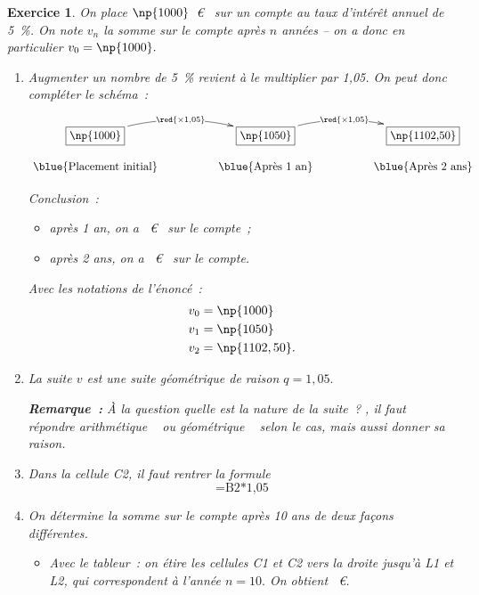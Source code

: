 \documentclass[10pt]{article}
\newtheorem{exo}{Exercice}
\begin{document}
\begin{exo}

On place $\np{1000}$~\euro~{} sur un compte au taux d'intérêt annuel de 5~\%. On note $v_n$ la somme sur le compte après $n$ années -- on a donc en particulier $v_0=\np{1000}.$
\begin{enumerate}
\item Augmenter un nombre de 5~\% revient à le multiplier par 1,05. On peut donc compléter le schéma~:

\begin{center}
$\xymatrix@R=0.5pc@C=4pc{
    *+[F]+\txt{\np{1000}} \ar@/^0.5cm/[r]|{\red{\times 1,05}} & 
    *+[F]+\txt{\np{1050}} \ar@/^0.5cm/[r]|{\red{\times 1,05}} & *+[F]+\txt{\np{1102,50}} \\
    \txt{\blue{\text{Placement initial}}}&
    \txt{\blue{\text{Après 1 an}}}&\txt{\blue{\text{Après 2 ans}}}
    }$
    
    \end{center}
    
\medskip
    
Conclusion~:

\begin{itemize}
\item[\textbullet] après 1 an, on a ~\euro~{} sur le compte~;
\item[\textbullet] après 2 ans, on a ~\euro~{} sur le compte.
\end{itemize}

Avec les notations de l'énoncé~:
\begin{align*}
v_0&=\np{1000}\\
v_1&=\np{1050}\\
v_2&=\np{1102,50}.
\end{align*}

\item La suite $v$ est une suite géométrique de raison $q=1,05.$

\medskip

\textbf{Remarque~:} \`A la question \og quelle est la nature de la suite~? \fg, il faut répondre \og arithmétique \fg~{} ou \og géométrique \fg~{} selon le cas, mais aussi donner sa raison.
\item Dans la cellule C2, il faut rentrer la formule \[\text{=B2*1,05}\]


\item On détermine la somme sur le compte après 10 ans de deux façons différentes.

\begin{itemize}
\item[\textbullet] Avec le tableur~: on étire les cellules C1 et C2 vers la droite jusqu'à L1 et L2, qui correspondent à l'année $n=10.$ On obtient ~\euro.


\end{itemize}
\end{enumerate}
\end{exo}
\end{document}
